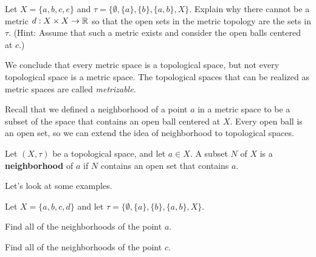\begin{activity} Let $X = \{a,b,c,e\}$ and $\tau = \{\emptyset, \{a\}, \{b\}, \{a,b\}, X \}$. Explain why there cannot be a  metric $d : X \times X \to \mathbb{R}$ so that the open sets in the metric topology are the sets in $\tau$. (Hint: Assume that such a metric exists and consider the open balls centered at $c$.)  

\end{activity}

\begin{comment}

\ActivitySolution Assume such a metric $d$ exists. Let $r = d(a,c)$. Then $B(c,r)$ is an open set containing $c$. The only such open set is $X$, but $d(a,c) < r$ implies that $a \notin B(c,r)$. This contradiction shows that no such metric exists.  

\end{comment}

We conclude that every metric space is a topological space, but not every topological space is a metric space. The topological spaces that can be realized as metric spaces are called \emph{metrizable}. 


Recall that we defined a neighborhood of a point $a$ in a metric space to be a subset of the space that contains an open ball centered at $X$. Every open ball is an open set, so we can extend the idea of neighborhood to topological spaces.

\begin{definition} Let $(X, \tau)$ be a topological space, and let $a \in X$. A subset $N$ of $X$ is a \textbf{neighborhood} of $a$ if $N$ contains an open set that contains $a$. 
\end{definition}

Let's look at some examples.

\begin{activity} Let $X = \{a,b,c,d\}$ and let $\tau = \{\emptyset, \{a\}, \{b\}, \{a,b\}, X \}$. 
\ba
\item Find all of the neighborhoods of the point $a$. 

\item Find all of the neighborhoods of the point $c$.

\ea

\end{activity}

